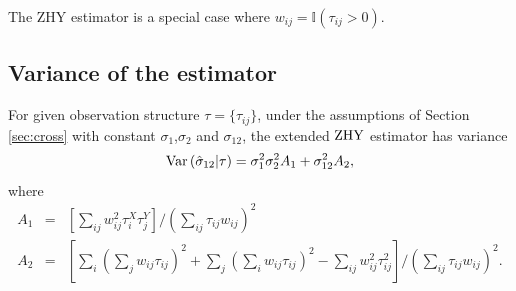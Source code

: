 The ZHY estimator is a special case where $w_{ij} = \mathbb{I}(\tau_{ij} > 0)$.
\subsection{Variance of the estimator} 
\begin{thm}\label{thm:genHY}
For given observation structure $\tau = \{\tau_{ij}\}$, under the assumptions of Section \ref{sec:cross} with constant $\sigma_1$,$\sigma_2$ and $\sigma_{12}$, the extended $\text{\rm ZHY}$ estimator has variance
$$\text{\rm Var}\, (\hat{\sigma}_{12}|\tau) = \sigma^2_1 \sigma^2_2 A_1 + \sigma^2_{12} A_2,$$
where 
\begin{equation}\label{eq:genZHY}
\begin{array}{lll}
A_1 &=& \left[\sum_{ij} w_{ij}^2 \tau_i^X \tau_j^Y \right] \bigg/\left(\sum_{ij} \tau_{ij} w_{ij}\right)^2 \\
A_2 &=& \left[\sum_i (\sum_j w_{ij} \tau_{ij})^2 + \sum_j(\sum_i w_{ij} \tau_{ij})^2 - \sum_{ij} w_{ij}^2 \tau_{ij}^2\right]\bigg/\left(\sum_{ij} \tau_{ij} w_{ij}\right)^2.
\end{array}
\end{equation}
\end{thm} 
